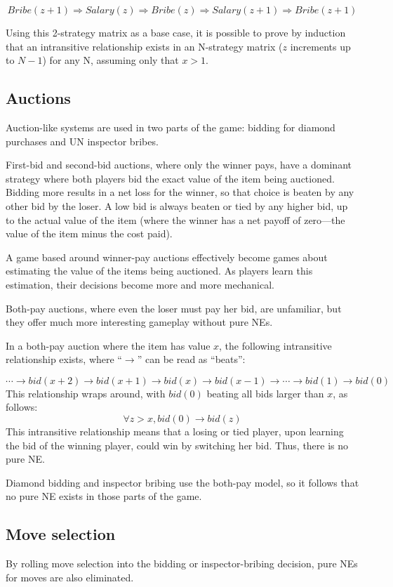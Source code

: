 \documentclass[12pt]{article}
\begin{document}
\[ Bribe(z+1) \Longrightarrow Salary(z) \Longrightarrow Bribe(z) \Longrightarrow Salary(z+1) \Longrightarrow Bribe(z+1)
\]  

Using this 2-strategy matrix as a base case, it is possible to prove by induction that an intransitive relationship exists in an N-strategy matrix ($z$ increments up to $N-1$) for any N, assuming only that $x>1$. 


\subsection{Auctions}
Auction-like systems are used in two parts of the game:  bidding for diamond purchases and UN inspector bribes.

First-bid and second-bid auctions, where only the winner pays, have a dominant strategy where both players bid the exact value of the item being auctioned.  Bidding more results in a net loss for the winner, so that choice is beaten by any other bid by the loser.  A low bid is always beaten or tied by any higher bid, up to the actual value of the item (where the winner has a net payoff of zero---the value of the item minus the cost paid).

A game based around winner-pay auctions effectively become games about estimating the value of the items being auctioned.  As players learn this estimation, their decisions become more and more mechanical.

Both-pay auctions, where even the loser must pay her bid, are unfamiliar, but they offer much more interesting gameplay without pure NEs.

In a both-pay auction where the item has value $x$, the following intransitive relationship exists, where ``$\longrightarrow$'' can be read as ``beats'':

\[ \cdots \longrightarrow bid(x+2) \longrightarrow bid(x+1) \longrightarrow bid(x) \longrightarrow bid(x-1) \longrightarrow \cdots \longrightarrow bid(1) \longrightarrow bid(0)
\]
This relationship wraps around, with $bid(0)$ beating all bids larger than $x$, as follows:
\[ \forall z>x, bid(0) \longrightarrow bid(z) \]
This intransitive relationship means that a losing or tied player, upon learning the bid of the winning player, could win by switching her bid.  Thus, there is no pure NE.

Diamond bidding and inspector bribing use the both-pay model, so it follows that no pure NE exists in those parts of the game.

\subsection{Move selection}
By rolling move selection into the bidding or inspector-bribing decision, pure NEs for moves are also eliminated.  
\end{document}
